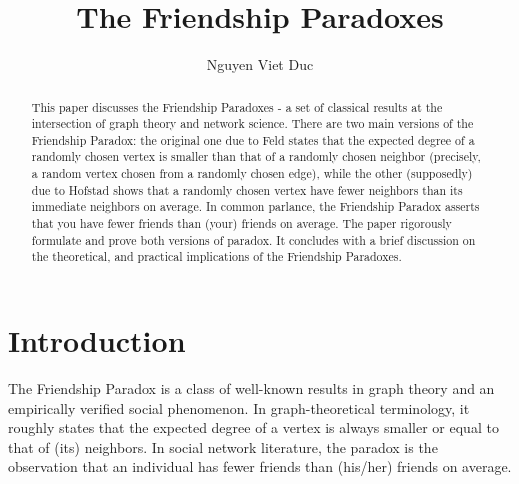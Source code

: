 \documentclass[12pt,reqno, a4]{amsart}
\begin{document}
\title{The Friendship Paradoxes}
\author{Nguyen Viet Duc}

\maketitle
\begin{abstract}
    This paper discusses the Friendship Paradoxes - a set of classical results at the intersection of graph theory and network science. There are two main versions of the Friendship Paradox: the original one due to Feld \cite{feld_why_1991} states that the expected degree of a randomly chosen vertex is smaller than that of a randomly chosen neighbor (precisely, a random vertex chosen from a randomly chosen edge), while the other (supposedly) due to Hofstad \cite{hofstad_random_2016} shows that a randomly chosen vertex have fewer neighbors than its immediate neighbors on average. In common parlance, the Friendship Paradox asserts that you have fewer friends than (your) friends on average. The paper rigorously formulate and prove both versions of paradox. It concludes with a brief discussion on the theoretical, and practical implications of the Friendship Paradoxes.
\end{abstract}
\tableofcontents

\section{Introduction}
The Friendship Paradox is a class of well-known results in graph theory and an empirically verified social phenomenon. In graph-theoretical terminology, it roughly states that the expected degree of a vertex is always smaller or equal to that of (its) neighbors. In social network literature, the paradox is the observation that an individual has fewer friends than (his/her) friends on average. 
\end{document}
